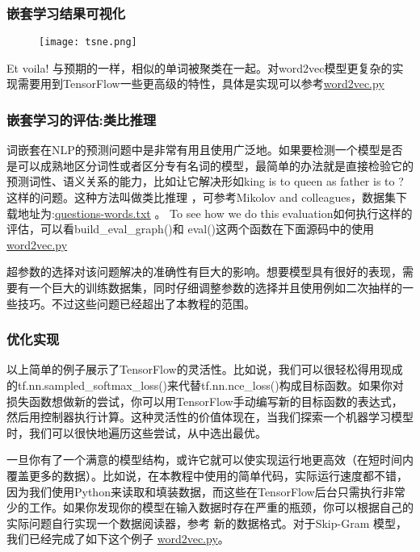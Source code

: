 \subsubsection{嵌套学习结果可视化}
\begin{center}
\begin{figure}[H]
\texttt{[image: tsne.png]}
\end{figure}
\end{center}
Et voila! 与预期的一样，相似的单词被聚类在一起。对word2vec模型更复杂的实现需要用到TensorFlow一些更高级的特性，具体是实现可以参考\href{https://github.com/bleedingfight/models/tree/master/tutorials/embedding}{word2vec.py}\subsubsection{嵌套学习的评估:类比推理}
词嵌套在NLP的预测问题中是非常有用且使用广泛地。如果要检测一个模型是否是可以成熟地区分词性或者区分专有名词的模型，最简单的办法就是直接检验它的预测词性、语义关系的能力，比如让它解决形如king is to queen as father is to ?这样的问题。这种方法叫做类比推理 ，可参考Mikolov and colleagues，数据集下载地址为:\href{https://word2vec.googlecode.com/svn/trunk/questions-words.txt}{questions-words.txt} 。
To see how we do this evaluation如何执行这样的评估，可以看build\_eval\_graph()和 eval()这两个函数在下面源码中的使用 \href{https://github.com/bleedingfight/models/tree/master/tutorials/embedding}{word2vec.py}

超参数的选择对该问题解决的准确性有巨大的影响。想要模型具有很好的表现，需要有一个巨大的训练数据集，同时仔细调整参数的选择并且使用例如二次抽样的一些技巧。不过这些问题已经超出了本教程的范围。
\subsubsection{优化实现}
以上简单的例子展示了TensorFlow的灵活性。比如说，我们可以很轻松得用现成的tf.nn.sampled\_softmax\_loss()来代替tf.nn.nce\_loss()构成目标函数。如果你对损失函数想做新的尝试，你可以用TensorFlow手动编写新的目标函数的表达式，然后用控制器执行计算。这种灵活性的价值体现在，当我们探索一个机器学习模型时，我们可以很快地遍历这些尝试，从中选出最优。

一旦你有了一个满意的模型结构，或许它就可以使实现运行地更高效（在短时间内覆盖更多的数据）。比如说，在本教程中使用的简单代码，实际运行速度都不错，因为我们使用Python来读取和填装数据，而这些在TensorFlow后台只需执行非常少的工作。如果你发现你的模型在输入数据时存在严重的瓶颈，你可以根据自己的实际问题自行实现一个数据阅读器，参考 新的数据格式。对于Skip-Gram 模型，我们已经完成了如下这个例子 \href{https://github.com/bleedingfight/models/tree/master/tutorials/embedding}{word2vec.py}。

